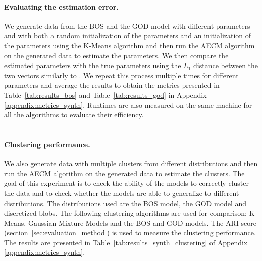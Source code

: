 \paragraph{Evaluating the estimation error.}
We generate data from the BOS and the GOD model with different parameters and with both a random initialization of the parameters and an initialization of the parameters using the K-Means algorithm and then run the AECM algorithm on the generated data to estimate the parameters. We then compare the estimated parameters with the true parameters using the $L_1$ distance between the two vectors similarly to \cite{biernacki2016model}. We repeat this process multiple times for different parameters and average the results to obtain the metrics presented in Table~\ref{tab:results_bos} and Table~\ref{tab:results_god} in Appendix \ref{appendix:metrics_synth}. Runtimes are also measured on the same machine for all the algorithms to evaluate their efficiency.
 \\ \\

\paragraph{Clustering performance.}
We also generate data with multiple clusters from different distributions and then run the AECM algorithm on the generated data to estimate the clusters. The goal of this experiment is to check the ability of the models to correctly cluster the data and to check whether the models are able to generalize to different distributions.
The distributions used are the BOS model, the GOD model and discretized blobs.
The following clustering algorithms are used for comparison: K-Means, Gaussian Mixture Models and the BOS and GOD models. The ARI score (section~\ref{sec:evaluation_method}) is used to measure the clustering performance. The results are presented in Table~\ref{tab:results_synth_clustering} of Appendix \ref{appendix:metrics_synth}. \\ \\

